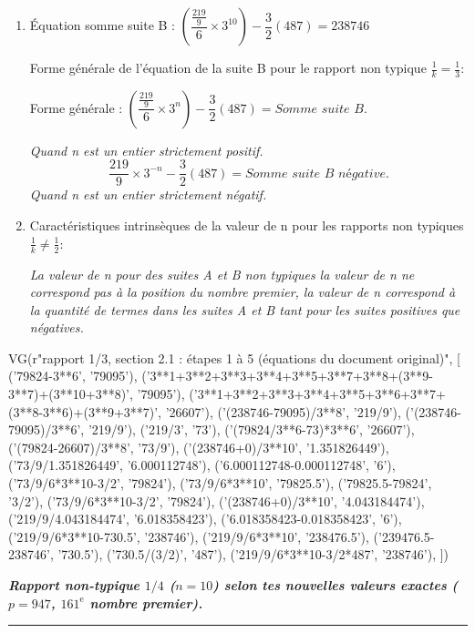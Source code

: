 \documentclass[11pt,a4paper]{article}
\begin{document}
\begin{enumerate}[label=\arabic*.,leftmargin=*,itemsep=6pt]
\item Équation somme suite B : $\left(\dfrac{\frac{219}{9}}{6}\times3^{10}\right)-\dfrac{3}{2}(487)=238746$

Forme générale de l’équation de la suite B pour le rapport non typique $\frac{1}{k}=\frac{1}{3}$:

Forme générale : $\left(\dfrac{\frac{219}{9}}{6}\times3^{n}\right)-\dfrac{3}{2}(487)=\textit{Somme suite B}.$

\textit{Quand n est un entier strictement positif.}
\[
\frac{219}{9}\times3^{-n}-\frac{3}{2}(487)=\textit{Somme suite B négative}.
\]
\textit{Quand n est un entier strictement négatif.}

\item Caractéristiques intrinsèques de la valeur de n pour les rapports non typiques $\frac{1}{k}\neq\frac{1}{2}$:

\textit{La valeur de n pour des suites A et B non typiques la valeur de n ne correspond pas à la position du nombre premier, la valeur de n correspond à la quantité de termes dans les suites A et B tant pour les suites positives que négatives.}
\end{enumerate}


\begin{pycode}
VG(r"rapport 1/3, section 2.1 : étapes 1 à 5 (équations du document original)", [
  ('79824-3**6', '79095'),
  ('3**1+3**2+3**3+3**4+3**5+3**7+3**8+(3**9-3**7)+(3**10+3**8)', '79095'),
  ('3**1+3**2+3**3+3**4+3**5+3**6+3**7+(3**8-3**6)+(3**9+3**7)', '26607'),
  ('(238746-79095)/3**8', '219/9'),
  ('(238746-79095)/3**6', '219/9'),
  ('219/3', '73'),
  ('(79824/3**6-73)*3**6', '26607'),
  ('(79824-26607)/3**8', '73/9'),
  ('(238746+0)/3**10', '1.351826449'),
  ('73/9/1.351826449', '6.000112748'),
  ('6.000112748-0.000112748', '6'),
  ('73/9/6*3**10-3/2', '79824'),
  ('73/9/6*3**10', '79825.5'),
  ('79825.5-79824', '3/2'),
  ('73/9/6*3**10-3/2', '79824'),
  ('(238746+0)/3**10', '4.043184474'),
  ('219/9/4.043184474', '6.018358423'),
  ('6.018358423-0.018358423', '6'),
  ('219/9/6*3**10-730.5', '238746'),
  ('219/9/6*3**10', '238476.5'),
  ('239476.5-238746', '730.5'),
  ('730.5/(3/2)', '487'),
  ('219/9/6*3**10-3/2*487', '238746'),
])
\end{pycode}


\medskip
\noindent\textbf{\textit{Rapport non-typique $1/4$ ($n=10$) selon tes nouvelles valeurs exactes ($p=947$, $161^{\text{e}}$ nombre premier).}}\par\noindent\rule{\linewidth}{0.8pt}
\end{document}
